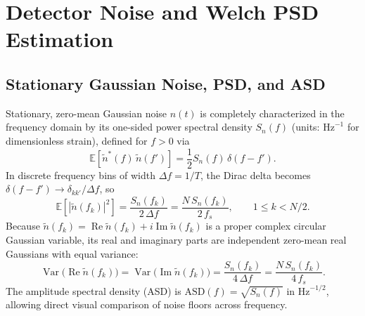 \documentclass[11pt,a4paper]{report}
\begin{document}
\chapter{Detector Noise and Welch PSD Estimation}

\section{Stationary Gaussian Noise, PSD, and ASD}
Stationary, zero-mean Gaussian noise $n(t)$ is completely characterized in the frequency domain by its one-sided power spectral density $S_n(f)$ (units: $\mathrm{Hz}^{-1}$ for dimensionless strain), defined for $f > 0$ via
\begin{equation}
\mathbb{E}\!\left[\tilde{n}^*(f)\,\tilde{n}(f')\right] = \frac{1}{2} S_n(f)\,\delta(f - f').
\end{equation}
In discrete frequency bins of width $\Delta f = 1/T$, the Dirac delta becomes $\delta(f - f') \to \delta_{kk'} / \Delta f$, so
\begin{equation}
\mathbb{E}\!\left[|\tilde{n}(f_k)|^2\right] = \frac{S_n(f_k)}{2\,\Delta f} = \frac{N\,S_n(f_k)}{2\,f_s}, \qquad 1 \le k < N/2.
\end{equation}
Because $\tilde{n}(f_k) = \operatorname{Re}\tilde{n}(f_k) + i\operatorname{Im}\tilde{n}(f_k)$ is a proper complex circular Gaussian variable, its real and imaginary parts are independent zero-mean real Gaussians with equal variance:
\begin{equation}
\operatorname{Var}\!\big(\operatorname{Re}\tilde{n}(f_k)\big) = \operatorname{Var}\!\big(\operatorname{Im}\tilde{n}(f_k)\big) = \frac{S_n(f_k)}{4\,\Delta f} = \frac{N\,S_n(f_k)}{4\,f_s}.
\end{equation}
The amplitude spectral density (ASD) is $\mathrm{ASD}(f) = \sqrt{S_n(f)}$ in $\mathrm{Hz}^{-1/2}$, allowing direct visual comparison of noise floors across frequency.
\end{document}
